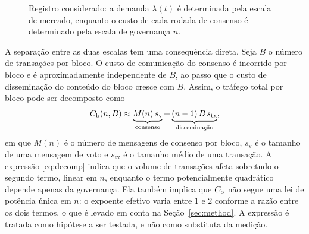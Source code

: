 \begin{figure}[!ht]
\centering
{}
\caption{Registro considerado: a demanda $\lambda(t)$ é determinada pela escala de mercado, enquanto o custo de cada rodada de consenso é determinado pela escala de governança $n$.}
\label{fig:system}
\end{figure}

A separação entre as duas escalas tem uma consequência direta. Seja $B$ o número de transações por bloco. O custo de comunicação do consenso é incorrido por bloco e é aproximadamente independente de $B$, ao passo que o custo de disseminação do conteúdo do bloco cresce com $B$. Assim, o tráfego total por bloco pode ser decomposto como
\begin{equation}
C_{\mathrm{b}}(n, B) \approx \underbrace{M(n)\, s_{\mathrm{v}}}_{\text{consenso}} + \underbrace{(n-1)\, B\, s_{\mathrm{tx}}}_{\text{disseminação}},
\label{eq:decomp}
\end{equation}
em que $M(n)$ é o número de mensagens de consenso por bloco, $s_{\mathrm{v}}$ é o tamanho de uma mensagem de voto e $s_{\mathrm{tx}}$ é o tamanho médio de uma transação. A expressão \eqref{eq:decomp} indica que o volume de transações afeta sobretudo o segundo termo, linear em $n$, enquanto o termo potencialmente quadrático depende apenas da governança. Ela também implica que $C_{\mathrm{b}}$ não segue uma lei de potência única em $n$: o expoente efetivo varia entre $1$ e $2$ conforme a razão entre os dois termos, o que é levado em conta na Seção~\ref{sec:method}. A expressão é tratada como hipótese a ser testada, e não como substituta da medição.

